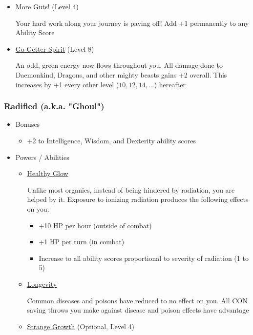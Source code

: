 \documentclass[12pt, landscape]{article}
\begin{document}
\begin{FlushLeft}
\begin{multicols}{2}
\begin{itemize}[wide]
\begin{itemize}
					\item \underline{More Guts!} (Level 4)

					Your hard work along your journey is paying off! Add +1 permanently to any Ability Score

					\item \underline{Go-Getter Spirit} (Level 8)

					An odd, green energy now flows throughout you.
					All damage done to Daemonkind, Dragons, and other mighty beasts gains +2 overall.
					This increases by +1 every other level ($10, 12, 14, \dots$) hereafter
				\end{itemize}
			\end{itemize}

			\subsubsection{Radified (a.k.a. "Ghoul")}
			\begin{itemize}[wide]
				\item Bonuses
				\begin{itemize}
					\item +2 to Intelligence, Wisdom, and Dexterity ability scores
				\end{itemize}
				\item Powers / Abilities
				\begin{itemize}
					\item \underline{Healthy Glow}

					Unlike most organics, instead of being hindered by radiation, you are helped by it.
					Exposure to ionizing radiation produces the following effects on you:
					\begin{itemize}
						\item +10 HP per hour (outside of combat)
						\item +1 HP per turn (in combat)
						\item Increase to all ability scores proportional to severity of radiation (1 to 5)
					\end{itemize}

					\item \underline{Longevity}

					Common diseases and poisons have reduced to no effect on you.
					All CON saving throws you make against disease and poison effects have advantage

					\item \underline{Strange Growth} (Optional, Level 4)


\end{itemize}
\end{itemize}
\end{multicols}
\end{FlushLeft}
\end{document}
